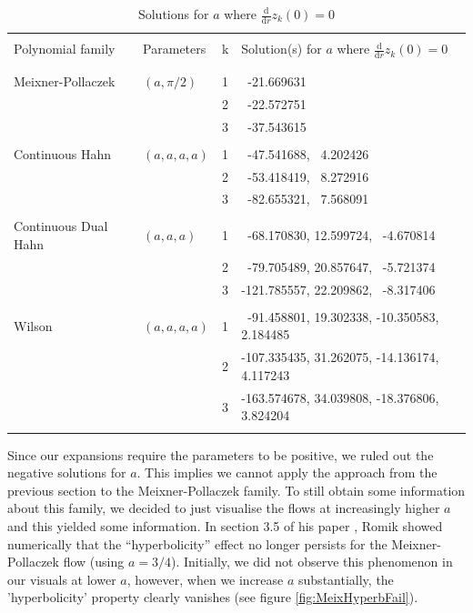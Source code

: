 \documentclass[a4paper,11pt,twoside]{amsart}
\begin{document}
\small{
\begin{table}[H]
  \begin{center}
    \caption{Solutions for $a$ where $\frac{\mathrm{d}}{\mathrm{d} r} z_k(0) = 0$}
    \label{tab:tablezeros3}
    \begin{tabular}{|l|l|c|l|} 
      \hline
       & & &\\
      Polynomial family & Parameters & k & Solution(s) for $a$ where $\frac{\mathrm{d}}{\mathrm{d} r} z_k(0) = 0$ \\
       & & &\\
      \hline
       & & &\\
      Meixner-Pollaczek & $(a, \pi/2)$ & 1 & \,\,\,-21.669631 \\
         &  & 2 & \,\,\,-22.572751 \\
         &  & 3 & \,\,\,-37.543615 \\
       & & &\\
      Continuous Hahn &$(a,a,a,a)$ & 1 & \,\,\,-47.541688, \,\,\,4.202426  \\  
         &  & 2 & \,\,\,-53.418419,  \,\,\,8.272916  \\
         &  & 3 & \,\,\,-82.655321,  \,\,\,7.568091 \\
       & & &\\
      Continuous Dual Hahn &$(a,a,a)$ & 1 & \,\,\,-68.170830, 12.599724, \,\,\,-4.670814\\ 
         &  & 2 & \,\,\,-79.705489, 20.857647, \,\,\,-5.721374 \\
         &  & 3 & -121.785557, 22.209862, \,\,\,-8.317406 \\
       & & &\\
      Wilson &$(a,a,a,a)$ & 1 &\,\,\,-91.458801,   19.302338, -10.350583, 2.184485 \\ 
         &  & 2 & -107.335435,  31.262075, -14.136174, 4.117243 \\
         &  & 3 & -163.574678, 34.039808, -18.376806, 3.824204 \\
       & & &\\
       \hline
    \end{tabular}
  \end{center}
\end{table}
}

Since our expansions require the parameters to be positive, we ruled out the negative solutions for $a$. This implies we cannot apply the approach from the previous section to the Meixner-Pollaczek family. To still obtain some information about this family, we decided to just visualise the flows at increasingly higher $a$ and this yielded some information. In section 3.5 of his paper \cite{rom}, Romik showed numerically that the “hyperbolicity” effect no longer persists for the Meixner-Pollaczek flow (using $a =3/4$). Initially, we did not observe this phenomenon in our visuals at lower $a$, however, when we increase $a$ substantially, the 'hyperbolicity' property clearly vanishes (see figure \ref{fig:MeixHyperbFail}).  
\end{document}
